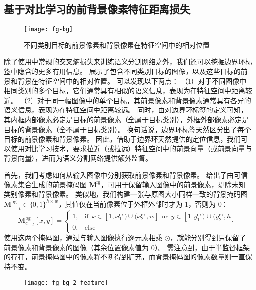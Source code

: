 \subsection{基于对比学习的前背景像素特征距离损失}
\begin{figure}[h]
\centering
\texttt{[image: fg-bg]}
\caption{不同类别目标的前景像素和背景像素在特征空间中的相对位置}
\label{fig:fg-bg}
\end{figure}
除了使用中常规的交叉熵损失来训练语义分割网络之外，我们还可以挖掘边界环标签中隐含的更多有用信息。
展示了包含不同类别目标的图像，以及这些目标的前景和背景在特征空间中的相对位置。
可以发现以下两点：
（1）对于不同图像中相同类别的多个目标，它们通常具有相似的语义信息，表现为在特征空间中距离较近。
（2）对于同一幅图像中的单个目标，其前景像素和背景像素通常具有各异的语义信息，表现为在特征空间中距离较远。
同时，由对边界环标签的定义可知，其内框内部像素必定是目标的前景像素（全属于目标类别），外框外部像素必定是目标的背景像素（全不属于目标类别）。
换句话说，边界环标签天然区分出了每个目标的前景像素和背景像素。
因此，借助于边界环天然提供的定位信息，我们可以使用对比学习技术，要求拉近（或拉远）特征空间中的前景向量（或前景向量与背景向量），进而为语义分割网络提供额外监督。
\par
首先，我们考虑如何从输入图像中分别获取前景像素和背景像素。
给出了由可信像素集合生成的前景掩码图 $\mathbf{M}^\text{fg}$，可用于保留输入图像中的前景像素，剔除未知类别像素和背景像素。
类似地，我们构建一张与原图大小同样一致的背景掩码图 $\mathbf{M}^\text{bg}\vert_t \in \{0,1\}^{h \times w}$，其值仅在当前像素位于外框外部时才为 $1$，否则为 $0$：
\begin{equation}
\mathbf{M}^\text{bg}_c\vert_{t}[x,y] =
\begin{cases}
1,&\text{if}\ \ x \in [1, x_1^\text{ex}) \cup (x_2^\text{ex}, w]\ \ \text{or}\ \ y \in [1, y_1^\text{ex}) \cup (y_2^\text{ex}, h]\\
0,&\text{else}
\end{cases}
\label{eqn:mask-bg}
\end{equation}
使用这两个掩码图，通过与输入图像执行逐元素相乘 $\odot$，就能分别得到只保留了前景像素和背景像素的图像（其余位置像素值为 $0$）。
需注意到，由于半监督框架的存在，前景掩码图中的像素将不断得到扩充，而背景掩码图的像素数量则一直保持不变。
\par
\begin{figure}[h]
\centering
\texttt{[image: fg-bg-2-feature]}
\caption{}
\label{fig:fg-bg-2-feature}
\end{figure}
